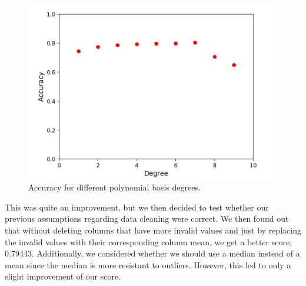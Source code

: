 \documentclass[10pt,conference,compsocconf]{IEEEtran}
\begin{document}
\begin{figure}[h]
  \centering
  \includegraphics[width=\columnwidth]{polynomial_basis_degrees}
  \caption{Accuracy for different polynomial basis degrees.}
  \vspace{-3mm}
\end{figure}

This was quite an improvement, but we then decided to test whether our previous assumptions regarding data cleaning were correct. We then found out that without deleting columns that have more invalid values and just by replacing the invalid values with their corresponding column mean, we get a better score, 0.79443. Additionally, we considered whether we should use a median instead of a mean since the median is more resistant to outliers. However, this led to only a slight improvement of our score.
\end{document}
